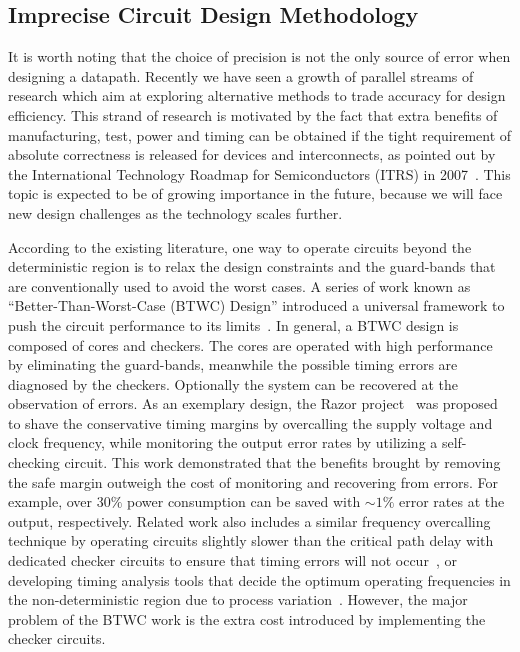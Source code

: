 \documentclass[prodmode,acmtrets]{acmsmall} %
\begin{document}

\subsection{Imprecise Circuit Design Methodology}\label{Section_Background_Imprecise}
It is worth noting that the choice of precision is not the only source of error when designing a datapath. Recently we have seen a growth of parallel streams of research which aim at exploring alternative methods to trade accuracy for design efficiency. This strand of research is motivated by the fact that extra benefits of manufacturing, test, power and timing can be obtained if the tight requirement of absolute correctness is released for devices and interconnects, as pointed out by the International Technology Roadmap for Semiconductors (ITRS) in 2007~\cite{semiconductor2007international}. This topic is expected to be of growing importance in the future, because we will face new design challenges as the technology scales further.

According to the existing literature, one way to operate circuits beyond the deterministic region is to relax the design constraints and the guard-bands that are conventionally used to avoid the worst cases. A series of work known as ``Better-Than-Worst-Case (BTWC) Design'' introduced a universal framework to push the circuit performance to its limits~\cite{BetterThanWS2005}. In general, a BTWC design is composed of cores and checkers. The cores are operated with high performance by eliminating the guard-bands, meanwhile the possible timing errors are diagnosed by the checkers. Optionally the system can be recovered at the observation of errors. As an exemplary design, the Razor project~\cite{Razor2003,Razor2004} was proposed to shave the conservative timing margins by overcalling the supply voltage and clock frequency, while monitoring the output error rates by utilizing a self-checking circuit. This work demonstrated that the benefits brought by removing the safe margin outweigh the cost of monitoring and recovering from errors. For example, over $30\%$ power consumption can be saved with $\sim1\%$ error rates at the output, respectively. Related work also includes a similar frequency overcalling technique by operating circuits slightly slower than the critical path delay with dedicated checker circuits to ensure that timing errors will not occur~\cite{TEAtime2004}, or developing timing analysis tools that decide the optimum operating frequencies in the non-deterministic region due to process variation~\cite{ProbabilisticSTA}. However, the major problem of the BTWC work is the extra cost introduced by implementing the checker circuits.
\end{document}
